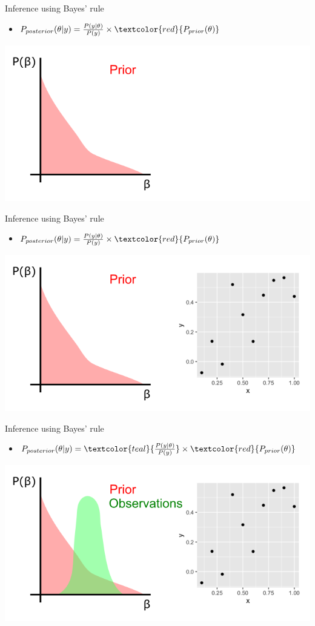 \documentclass[10pt]{beamer}
\begin{document}
\begin{frame}{Inference using Bayes' rule}
  \begin{itemize}
   \item $P_{posterior}(\theta|y) = \frac{P(y|\theta)}{P(y)} \times \textcolor{red}{P_{prior}(\theta)} $
      \end{itemize}
\includegraphics[width=\textwidth]{bayes-inf-1.png}
\end{frame}
\begin{frame}{Inference using Bayes' rule}
  \begin{itemize}
   \item $P_{posterior}(\theta|y) = \frac{P(y|\theta)}{P(y)} \times \textcolor{red}{P_{prior}(\theta)} $
      \end{itemize}
\includegraphics[width=\textwidth]{bayes-inf-2.png}
\end{frame}
\begin{frame}{Inference using Bayes' rule}
  \begin{itemize}
  \item $P_{posterior}(\theta|y) = \textcolor{teal}{\frac{P(y|\theta)}{P(y)}} \times \textcolor{red}{P_{prior}(\theta)} $
      \end{itemize}
\includegraphics[width=\textwidth]{bayes-inf-3.png}
\end{frame}
\end{document}
